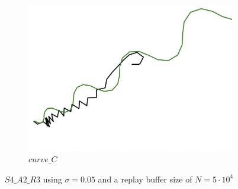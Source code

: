 \begin{figure}[H]
\begin{subfigure}[b]{0.31\textwidth}
         \includegraphics[width=\textwidth]{images/ddpg_results/envs_S3_S4_S5/S4_A2_R3_curve_C.png}
         \caption{$curve\_C$}
         \label{fig:a5c}
     \end{subfigure}
        \caption{$S4\_A2\_R3$ using $\sigma=0.05$ and a replay buffer size of $N=5\cdot 10^4$}
        \label{fig:advCurves5}
\end{figure}

